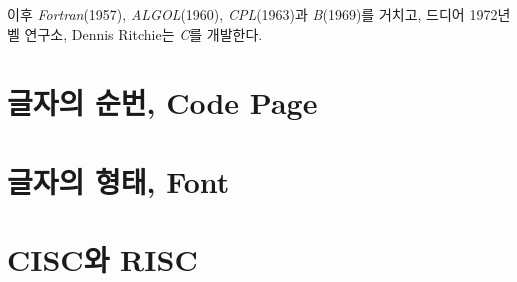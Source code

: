 \documentclass{article}
\begin{document}
이후 \textit{Fortran}(1957), \textit{ALGOL}(1960), \textit{CPL}(1963)과
\textit{B}(1969)를 거치고, 드디어 1972년 벨 연구소, Dennis Ritchie는
\textit{C}를 개발한다.

\pagebreak

\appendix

\section{글자의 순번, Code Page}
\label{sec:code-page}

\section{글자의 형태, Font}
\label{sec:fonts}

\section{CISC와 RISC}
\label{sec:cisc-risc}
\end{document}
